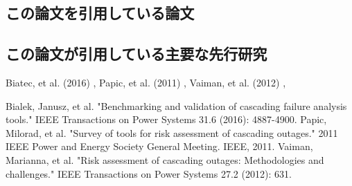 \documentclass[a4paper,11pt]{jsarticle}
\begin{document}
    \subsection{この論文を引用している論文}
    \subsection{この論文が引用している主要な先行研究}
    Biatec, et al. (2016) \cite{BialekETAL2016},
    Papic, et al. (2011) \cite{PapicETAL2011},
    Vaiman, et al. (2012) \cite{VaimanETAL2012},

\newpage

\begin{thebibliography}{99}
  Bialek, Janusz, et al. "Benchmarking and validation of cascading failure analysis tools." IEEE Transactions on Power Systems 31.6 (2016): 4887-4900.
  Papic, Milorad, et al. "Survey of tools for risk assessment of cascading outages." 2011 IEEE Power and Energy Society General Meeting. IEEE, 2011.
  Vaiman, Marianna, et al. "Risk assessment of cascading outages: Methodologies and challenges." IEEE Transactions on Power Systems 27.2 (2012): 631.
\end{thebibliography}
\end{document}
